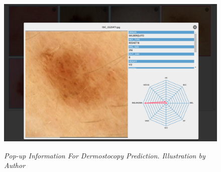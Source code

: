 \begin{figure}[H]
\centering
    \includegraphics[width=\textwidth]{imatges/results/extra-inf-popup.png}
\caption[Pop-up Information For Dermostocopy Prediction]{\textit{Pop-up Information For Dermostocopy Prediction. Illustration by Author}}
{\label{fig:extra-inf-popup}}
\end{figure}
